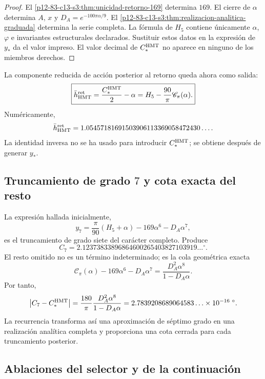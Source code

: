 \begin{proof}
El \cref{p12-83-c13-s3:thm:unicidad-retorno-169} determina \(169\). El cierre de
\(\alpha\) determina \(A\), \(x\) y
\(D_A=e^{-100\pi\alpha/9}\). El \cref{p12-83-c13-s3:thm:realizacion-analitica-graduada}
determina la serie completa. La fórmula de \(H_5\) contiene únicamente
\(\alpha\), \(\varphi\) e invariantes estructurales declarados. Sustituir
estos datos en la expresión de \(y_*\) da el valor impreso. El valor decimal
de \(C_*^{\rm HMT}\) no aparece en ninguno de los miembros derechos.
\end{proof}

La componente reducida de acción posterior al retorno queda ahora como
salida:
\[
\boxed{
\bar h_{\rm HMT}^{\rm ret}
=\frac{C_*^{\rm HMT}}2-\alpha
=H_5-\frac{90}{\pi}\mathscr C_\pi(\alpha).}
\]
Numéricamente,
\[
\bar h_{\rm HMT}^{\rm ret}
=1.05457181691503906113369058472430\ldots.
\]
La identidad inversa no se ha usado para introducir \(C_*^{\rm HMT}\); se
obtiene después de generar \(y_*\).

\subsection{Truncamiento de grado \(7\) y cota exacta del resto}

La expresión hallada inicialmente,
\[
y_7=\frac\pi{90}(H_5+\alpha)-169\alpha^6-D_A\alpha^7,
\]
es el truncamiento de grado siete del carácter completo. Produce
\[
C_7=2.12373833896864600265403827103919\ldots{}^\circ.
\]
El resto omitido no es un término indeterminado; es la cola geométrica
exacta
\[
\mathscr C_\pi(\alpha)
-169\alpha^6-D_A\alpha^7
=\frac{D_A^2\alpha^8}{1-D_A\alpha}.
\]
Por tanto,
\[
\left|C_7-C_*^{\rm HMT}\right|
=\frac{180}{\pi}\frac{D_A^2\alpha^8}{1-D_A\alpha}
=2.7839208689064583\ldots\times10^{-16}\;{}^\circ.
\]
La recurrencia transforma así una aproximación de séptimo grado en una
realización analítica completa y proporciona una cota cerrada para cada
truncamiento posterior.

\subsection{Ablaciones del selector y de la continuación}


